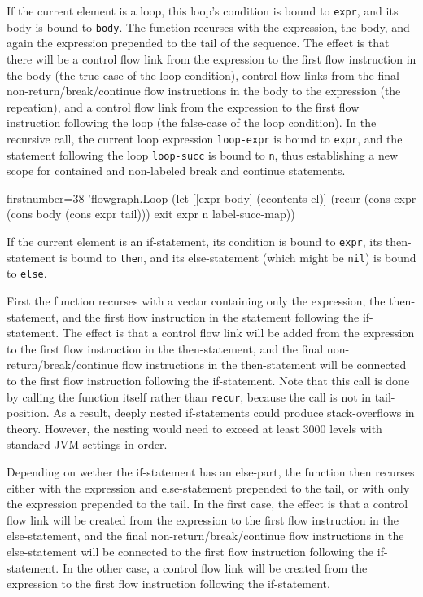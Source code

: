 \documentclass[11pt]{article}
\begin{document}
If the current element is a loop, this loop's condition is bound to
\verb|expr|, and its body is bound to \verb|body|.  The function recurses with
the expression, the body, and again the expression prepended to the tail of the
sequence.  The effect is that there will be a control flow link from the
expression to the first flow instruction in the body (the true-case of the loop
condition), control flow links from the final non-return/break/continue flow
instructions in the body to the expression (the repeation), and a control flow
link from the expression to the first flow instruction following the loop (the
false-case of the loop condition).  In the recursive call, the current loop
expression \verb|loop-expr| is bound to \verb|expr|, and the statement
following the loop \verb|loop-succ| is bound to \verb|n|, thus establishing a
new scope for contained and non-labeled break and continue statements.

\begin{clojurecode*}{firstnumber=38}
        'flowgraph.Loop
                   (let [[expr body] (econtents el)]
                     (recur (cons expr (cons body (cons expr tail)))
                            exit expr n label-succ-map))
\end{clojurecode*}

If the current element is an if-statement, its condition is bound to
\verb|expr|, its then-statement is bound to \verb|then|, and its else-statement
(which might be \verb|nil|) is bound to \verb|else|.

First the function recurses with a vector containing only the expression, the
then-statement, and the first flow instruction in the statement following the
if-statement.  The effect is that a control flow link will be added from the
expression to the first flow instruction in the then-statement, and the final
non-return/break/continue flow instructions in the then-statement will be
connected to the first flow instruction following the if-statement.  Note that
this call is done by calling the function itself rather than \verb|recur|,
because the call is not in tail-position.  As a result, deeply nested
if-statements could produce stack-overflows in theory.  However, the nesting
would need to exceed at least 3000 levels with standard JVM settings in order.

\begin{sloppypar}
  Depending on wether the if-statement has an else-part, the function then
  recurses either with the expression and else-statement prepended to the tail,
  or with only the expression prepended to the tail.  In the first case, the
  effect is that a control flow link will be created from the expression to the
  first flow instruction in the else-statement, and the final
  non-return/break/continue flow instructions in the else-statement will be
  connected to the first flow instruction following the if-statement.  In the
  other case, a control flow link will be created from the expression to the
  first flow instruction following the if-statement.
\end{sloppypar}
\end{document}
